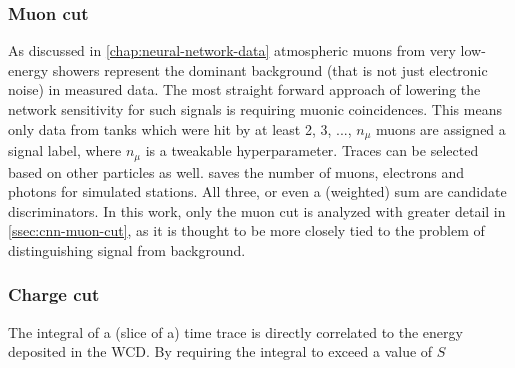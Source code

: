 \subsubsection{Muon cut}
\label{sssec:muon-cut}

As discussed in \autoref{chap:neural-network-data} atmospheric muons from very low-energy showers represent the dominant background (that is not just electronic 
noise) in measured data. The most straight forward approach of lowering the network sensitivity for such signals is requiring muonic coincidences. This means only 
data from tanks which were hit by at least 2, 3, ..., $n_\mu$ muons are assigned a signal label, where $n_\mu$ is a tweakable hyperparameter. Traces can be 
selected based on other particles as well. \Offline saves the number of muons, electrons and photons for simulated stations. All three, or even a (weighted) sum
are candidate discriminators. In this work, only the muon cut is analyzed with greater detail in \autoref{ssec:cnn-muon-cut}, as it is thought to be more closely 
tied to the problem of distinguishing signal from background.

\subsubsection{Charge cut}
\label{sssec:charge-cut}

The integral of a (slice of a) time trace is directly correlated to the energy deposited in the WCD. By requiring the integral to exceed a value of $S$ 

